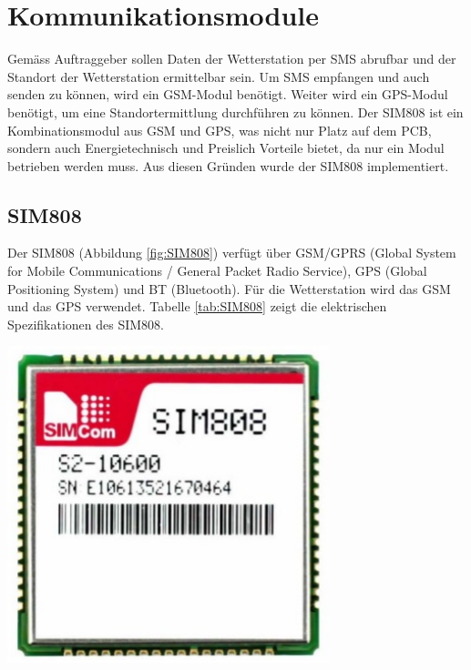 \chapter{Kommunikationsmodule}
\label{chap:Kommunikationsmodule}
Gemäss Auftraggeber sollen Daten der Wetterstation per SMS abrufbar und der Standort der Wetterstation ermittelbar sein. Um SMS empfangen und auch senden zu können, wird ein GSM-Modul benötigt. Weiter wird ein GPS-Modul benötigt, um eine Standortermittlung durchführen zu können. Der SIM808 ist ein Kombinationsmodul aus GSM und GPS, was nicht nur Platz auf dem PCB, sondern auch Energietechnisch und Preislich Vorteile bietet, da nur ein Modul betrieben werden muss. Aus diesen Gründen wurde der SIM808 implementiert.

\section{SIM808}
{\begin{minipage}[b][6cm][t]{0.52\textwidth}
Der SIM808 (Abbildung \ref{fig:SIM808}) verfügt über GSM/GPRS (Global System for Mobile Communications / General Packet Radio Service), GPS (Global Positioning System) und BT (Bluetooth). Für die Wetterstation wird das GSM und das GPS verwendet. Tabelle \ref{tab:SIM808} zeigt die elektrischen Spezifikationen des SIM808. \cite{SIM808}\\
\end{minipage}}
{\begin{minipage}[b][6cm][t]{0.47\textwidth}
\centering
\includegraphics[width=0.7\textwidth]{graphics/SIM808/SIM808.JPG}
\label{fig:SIM808}
\end{minipage}}



